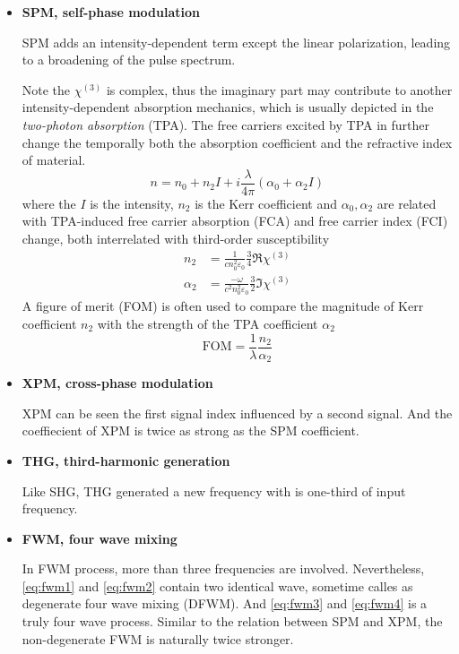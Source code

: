 \documentclass[final]{kuee_en}
\begin{document}
\begin{itemize}
    \item \textbf{SPM, self-phase modulation}
    
    SPM adds an intensity-dependent term except the linear polarization, leading to a broadening of the pulse spectrum.
    
    Note the $\chi^{(3)}$ is complex, thus the imaginary part may contribute to another intensity-dependent absorption mechanics, which is usually depicted in the \textit{two-photon absorption} (TPA). The free carriers excited by TPA in further change the temporally both the absorption coefficient and the refractive index of material.
    \begin{equation}\label{eq:spm-index}
        n = n_0 + n_2 I + i \frac{\lambda}{4\pi}(\alpha_0 + \alpha_2 I)
    \end{equation}
    where the $I$ is the intensity, $n_2$ is the Kerr coefficient and $\alpha_0, \alpha_2$ are related with TPA-induced free carrier absorption (FCA) and free carrier index (FCI) change, both interrelated with third-order susceptibility
    \begin{align}
        n_2     &= \frac{1}{cn_0^2\varepsilon_0} \frac{3}{4} \Re{\chi^{(3)}} \\
        \alpha_2&= \frac{-\omega}{c^2n_0^2\varepsilon_0} \frac{3}{2} \Im{\chi^{(3)}}
    \end{align}
    A figure of merit (FOM) is often used to compare the magnitude of Kerr coefficient $n_2$ with the strength of the TPA coefficient $\alpha_2$
    \begin{equation}
        \mathrm{FOM} = \frac{1}{\lambda} \frac{n_2}{\alpha_2}
    \end{equation}
    
    \item \textbf{XPM, cross-phase modulation} 
    
    XPM can be seen the first signal index influenced by a second signal. And the coeffiecient of XPM is twice as strong as the SPM coefficient.
    \item \textbf{THG, third-harmonic generation} 
    
    Like SHG, THG generated a new frequency with is one-third of input frequency. 
    \item \textbf{FWM, four wave mixing} 
    
In FWM process, more than three frequencies are involved. Nevertheless, \autoref{eq:fwm1} and \autoref{eq:fwm2} contain two identical wave, sometime calles as degenerate four wave mixing (DFWM). And \autoref{eq:fwm3} and \autoref{eq:fwm4} is a truly four wave process. Similar to the relation between SPM and XPM, the non-degenerate FWM is naturally twice stronger.


\end{itemize}
\end{document}

